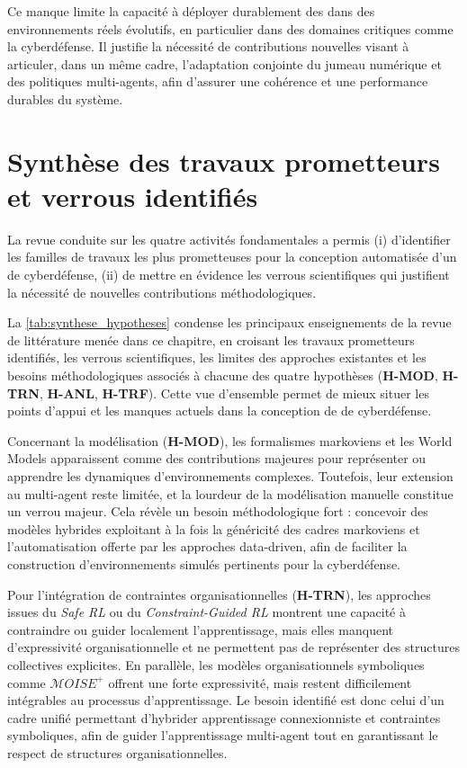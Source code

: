 Ce manque limite la capacité à déployer durablement des  dans des environnements réels évolutifs, en particulier dans des domaines critiques comme la cyberdéfense. Il justifie la nécessité de contributions nouvelles visant à articuler, dans un même cadre, l’adaptation conjointe du jumeau numérique et des politiques multi-agents, afin d’assurer une cohérence et une performance durables du système.


\section*{Synthèse des travaux prometteurs et verrous identifiés}

La revue conduite sur les quatre activités fondamentales a permis
(i) d’identifier les familles de travaux les plus prometteuses pour la conception automatisée d’un  de cyberdéfense,
(ii) de mettre en évidence les verrous scientifiques qui justifient la nécessité de nouvelles contributions méthodologiques.

\noindent
La \autoref{tab:synthese_hypotheses} condense les principaux enseignements de la revue de littérature menée dans ce chapitre, en croisant les travaux prometteurs identifiés, les verrous scientifiques, les limites des approches existantes et les besoins méthodologiques associés à chacune des quatre hypothèses (\textbf{H-MOD}, \textbf{H-TRN}, \textbf{H-ANL}, \textbf{H-TRF}). Cette vue d’ensemble permet de mieux situer les points d’appui et les manques actuels dans la conception de  de cyberdéfense.

Concernant la modélisation (\textbf{H-MOD}), les formalismes markoviens et les World Models apparaissent comme des contributions majeures pour représenter ou apprendre les dynamiques d’environnements complexes. Toutefois, leur extension au multi-agent reste limitée, et la lourdeur de la modélisation manuelle constitue un verrou majeur. Cela révèle un besoin méthodologique fort : concevoir des modèles hybrides exploitant à la fois la généricité des cadres markoviens et l’automatisation offerte par les approches data-driven, afin de faciliter la construction d’environnements simulés pertinents pour la cyberdéfense.

Pour l’intégration de contraintes organisationnelles (\textbf{H-TRN}), les approches issues du \textit{Safe RL} ou du \textit{Constraint-Guided RL} montrent une capacité à contraindre ou guider localement l’apprentissage, mais elles manquent d’expressivité organisationnelle et ne permettent pas de représenter des structures collectives explicites. En parallèle, les modèles organisationnels symboliques comme $\mathcal{M}OISE^+$ offrent une forte expressivité, mais restent difficilement intégrables au processus d’apprentissage. Le besoin identifié est donc celui d’un cadre unifié permettant d’hybrider apprentissage connexionniste et contraintes symboliques, afin de guider l’apprentissage multi-agent tout en garantissant le respect de structures organisationnelles.

